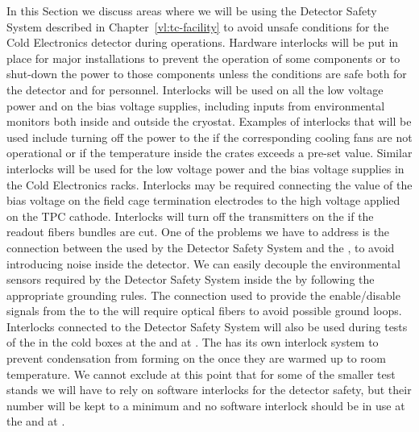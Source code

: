 In this Section we discuss areas where we will be using
the Detector Safety System described in Chapter~\ref{vl:tc-facility}
to avoid unsafe conditions for the Cold Electronics detector 
during operations. Hardware interlocks will be put in place
for major installations to prevent the operation of some 
components or to shut-down the power to those components 
unless the conditions are safe
both for the detector and for personnel. Interlocks will be
used on all the low voltage power and on the bias voltage 
supplies, including inputs from environmental monitors both
inside and outside the cryostat. Examples of interlocks that
will be used include turning off the power to the 
if the corresponding cooling fans are not operational or
if the temperature inside the crates exceeds a pre-set value.
Similar interlocks will be used for the low voltage power
and the bias voltage supplies in the Cold Electronics racks.
Interlocks may be required connecting the value of the 
bias voltage on the field cage termination electrodes to the
high voltage applied on the TPC cathode. Interlocks will turn 
off the transmitters on the  if the readout fibers 
bundles are cut. One of the problems we have to address is 
the connection between the  used by the Detector 
Safety System and the , to avoid introducing noise 
inside the detector. We can easily decouple the environmental 
sensors required by the Detector Safety System inside the 
 by following the appropriate grounding rules. 
The connection used to provide the enable/disable signals 
from the  to the  will require optical 
fibers to avoid possible ground loops. Interlocks connected
to the Detector Safety System will also be used during tests 
of the  in the cold boxes at the  and 
at \surf. The  has its own interlock system to
prevent condensation from forming on the  once
they are warmed up to room temperature. We cannot exclude at
this point that for some of the smaller test stands we will 
have to rely on software interlocks for the detector safety,
but their number will be kept to a minimum and no software
interlock should be in use at the  and at \surf.
